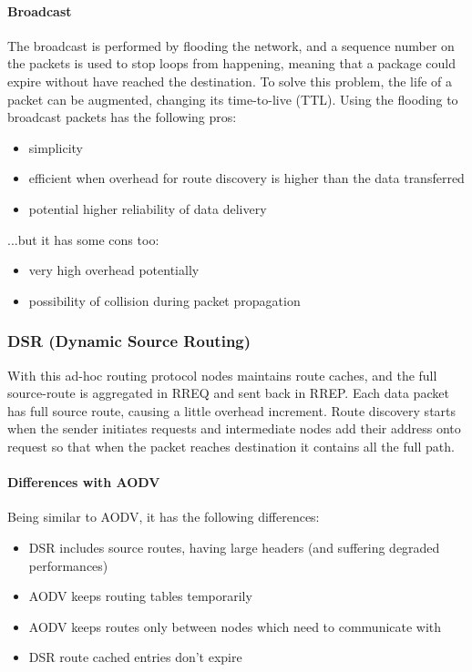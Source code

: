 \paragraph*{Broadcast} The broadcast is performed by flooding the network, and
a sequence number on the packets is used to stop loops from happening, meaning
that a package could expire without have reached the destination. To solve this
problem, the life of a packet can be augmented, changing its time-to-live (TTL).
Using the flooding to broadcast packets has the following pros:
\begin{itemize}
\item simplicity
\item efficient when overhead for route discovery is higher than the data
  transferred
  \item potential higher reliability of data delivery
\end{itemize}
...but it has some cons too:
\begin{itemize}
\item very high overhead potentially
\item possibility of collision during packet propagation
\end{itemize}

\subsubsection{DSR (Dynamic Source Routing)}

With this ad-hoc routing protocol nodes maintains route caches, and the full
source-route is aggregated in RREQ and sent back in RREP. Each data packet has
full source route, causing a little overhead increment.
Route discovery starts when the sender initiates requests and intermediate nodes
add their address onto request so that when the packet reaches destination it
contains all the full path.

\paragraph*{Differences with AODV} Being similar to AODV, it has the following
differences:
\begin{itemize}
\item DSR includes source routes, having large headers (and suffering degraded
  performances)
\item AODV keeps routing tables temporarily
\item AODV keeps routes only between nodes which need to communicate with
\item DSR route cached entries don't expire
\end{itemize}

